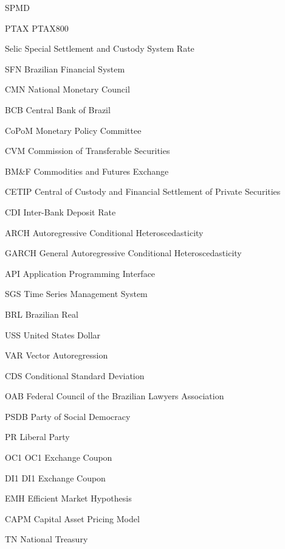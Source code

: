 \documentclass[cic,tc, english]{iiufrgs}
\begin{document}
\listoffigures

\listoftables

\begin{listofabbrv}{SPMD}
    \item[PTAX] PTAX800
    \item[Selic] Special Settlement and Custody System Rate
    \item[SFN] Brazilian Financial System
    \item[CMN] National Monetary Council
    \item[BCB] Central Bank of Brazil
    \item[CoPoM] Monetary Policy Committee
    \item[CVM] Commission of Transferable Securities
    \item[BM\&F] Commodities and Futures Exchange
    \item[CETIP] Central of Custody and Financial Settlement of Private Securities
    \item[CDI] Inter-Bank Deposit Rate
    \item[ARCH] Autoregressive Conditional Heteroscedasticity
    \item[GARCH] General Autoregressive Conditional Heteroscedasticity
    \item[API] Application Programming Interface
    \item[SGS] Time Series Management System
    \item[BRL] Brazilian Real
    \item[USS] United States Dollar
    \item[VAR] Vector Autoregression
    \item[CDS] Conditional Standard Deviation
    \item[OAB] Federal Council of the Brazilian Lawyers Association
    \item[PSDB] Party of Social Democracy
    \item[PR] Liberal Party
    \item[OC1] OC1 Exchange Coupon  
    \item[DI1] DI1 Exchange Coupon
    \item[EMH] Efficient Market Hypothesis
    \item[CAPM] Capital Asset Pricing Model
    \item[TN] National Treasury

\end{listofabbrv}
\end{document}
